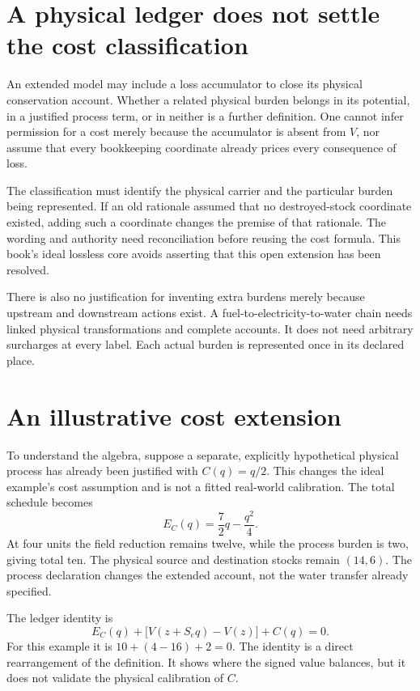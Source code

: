 \section{A physical ledger does not settle the cost classification}
An extended model may include a loss accumulator to close its physical conservation account. Whether a related physical burden belongs in its potential, in a justified process term, or in neither is a further definition. One cannot infer permission for a cost merely because the accumulator is absent from \(V\), nor assume that every bookkeeping coordinate already prices every consequence of loss.

The classification must identify the physical carrier and the particular burden being represented. If an old rationale assumed that no destroyed-stock coordinate existed, adding such a coordinate changes the premise of that rationale. The wording and authority need reconciliation before reusing the cost formula. This book's ideal lossless core avoids asserting that this open extension has been resolved.

There is also no justification for inventing extra burdens merely because upstream and downstream actions exist. A fuel-to-electricity-to-water chain needs linked physical transformations and complete accounts. It does not need arbitrary surcharges at every label. Each actual burden is represented once in its declared place.

\section{An illustrative cost extension}
To understand the algebra, suppose a separate, explicitly hypothetical physical process has already been justified with \(C(q)=q/2\). This changes the ideal example's cost assumption and is not a fitted real-world calibration. The total schedule becomes
\begin{equation}
 E_C(q)=\frac72q-\frac{q^2}{4}.
\end{equation}
At four units the field reduction remains twelve, while the process burden is two, giving total ten. The physical source and destination stocks remain \((14,6)\). The process declaration changes the extended account, not the water transfer already specified.

The ledger identity is
\begin{equation}
 E_C(q)+\bigl[V(z+S_eq)-V(z)\bigr]+C(q)=0.
\end{equation}
For this example it is \(10+(4-16)+2=0\). The identity is a direct rearrangement of the definition. It shows where the signed value balances, but it does not validate the physical calibration of \(C\).

